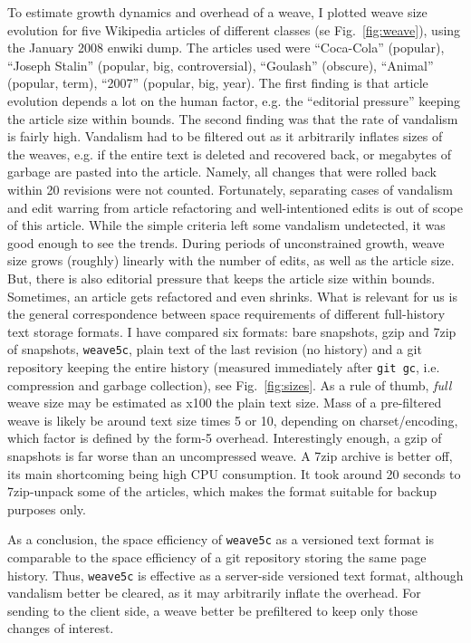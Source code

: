 \documentclass{sig-alternate}
\begin{document}
To estimate growth dynamics and overhead of a weave, I plotted weave size evolution for five Wikipedia articles of different classes (se Fig.~\ref{fig:weave}), using the January 2008 enwiki dump.
The articles used were ``Coca-Cola'' (popular), ``Joseph Stalin'' (popular, big, controversial), ``Goulash'' (obscure), ``Animal'' (popular, term), ``2007'' (popular, big, year).
The first finding is that article evolution depends a lot on the human factor, e.g. the ``editorial pressure'' keeping the article size within bounds.
The second finding was that the rate of vandalism is fairly high.
Vandalism had to be filtered out as it arbitrarily inflates sizes of the weaves, e.g. if the entire text is deleted and recovered back, or megabytes of garbage are pasted into the article.
Namely, all changes that were rolled back within 20 revisions were  not counted.
Fortunately, separating cases of vandalism and edit warring from article refactoring and well-intentioned edits is out of scope of this article.
While the simple criteria left some vandalism undetected, it was good enough to see the trends.
During periods of unconstrained growth, weave size grows (roughly) linearly with the number of edits, as well as the article size.
But, there is also editorial pressure that keeps the article size within bounds. Sometimes, an article gets refactored and even shrinks.
What is relevant for us is the general correspondence between space requirements of different full-history text storage formats.
I have compared six formats: bare snapshots, gzip and 7zip of snapshots, {\tt weave5c}, plain text of the last revision (no history) and a git repository keeping the entire history (measured immediately after \verb+git gc+, i.e. compression and garbage collection), see Fig.~\ref{fig:sizes}.
As a rule of thumb, \emph{full} weave size may be estimated as x100 the plain text size.
Mass of a pre-filtered weave is likely be around text size times 5 or 10, depending on charset/encoding, which factor is defined by the form-5 overhead.
Interestingly enough, a gzip of snapshots is far worse than an uncompressed weave.
A 7zip archive is better off, its main shortcoming being high CPU consumption. It took around 20 seconds to 7zip-unpack some of the articles, which makes the format  suitable for backup purposes only.

As a conclusion, the space efficiency of {\tt weave5c} as a versioned text format is comparable to the space efficiency of a git repository storing the same page history.
Thus, {\tt weave5c} is effective as a server-side versioned text format, although vandalism better be cleared, as it may arbitrarily inflate the overhead.
For sending to the client side, a weave better be prefiltered to keep only those changes of interest.
\end{document}
